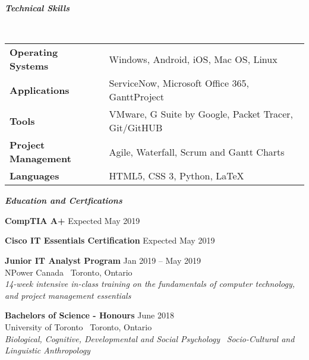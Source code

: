 \documentclass{article}
\begin{document}
\smallskip

\begin{center}
 \large \textcolor{ablue}{\textit{\textbf{Technical Skills}}}
\end{center}

~\begin{tabular}{l l}
 
\textbf{Operating Systems} & Windows, Android, iOS, Mac OS, Linux  \\
\textbf{Applications} & ServiceNow, Microsoft Office 365, GanttProject  \\
\textbf{Tools} & VMware, G Suite by Google, Packet Tracer, Git/GitHUB \\
\textbf{Project Management} & Agile, Waterfall, Scrum and Gantt Charts \\
\textbf{Languages} & HTML5, CSS 3, Python, \LaTeX \\

\end{tabular}

\bigskip

\begin{center}
 \large  \textcolor{ablue}{\textit{\textbf{Education and Certfications}}}
\end{center}

\begin{doublespacing}

\noindent \textbf{CompTIA A+}    
\hfill Expected May 2019

\noindent \textbf{Cisco IT Essentials Certification}
\hfill Expected May 2019 

\begin{singlespacing}

\noindent \textbf{Junior IT Analyst Program} 
\hfill Jan 2019 – May 2019 
\\\noindent NPower Canada \textbar \ {Toronto, Ontario }
\\\noindent \textit{14-week intensive in-class training on the fundamentals of computer technology, and project management essentials}

\end{singlespacing}

\begin{singlespacing}

\noindent \textbf{Bachelors of Science - Honours} 
\hfill June 2018 
\\\noindent University of Toronto \textbar \ Toronto, Ontario
\\\noindent \textit{Biological, Cognitive, Developmental and Social Psychology} \textbar  \  \textit{Socio-Cultural and Linguistic Anthropology}

\end{singlespacing}

\end{doublespacing}
\end{document}
